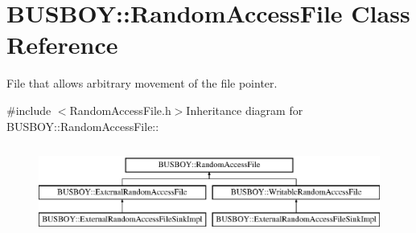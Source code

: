 \hypertarget{classBUSBOY_1_1RandomAccessFile}{
\section{BUSBOY::RandomAccessFile Class Reference}
\label{classBUSBOY_1_1RandomAccessFile}
}


File that allows arbitrary movement of the file pointer.  


{\ttfamily \#include $<$RandomAccessFile.h$>$}Inheritance diagram for BUSBOY::RandomAccessFile::\begin{figure}[H]
\begin{center}
\leavevmode
\includegraphics[height=3cm]{classBUSBOY_1_1RandomAccessFile}
\end{center}
\end{figure}
